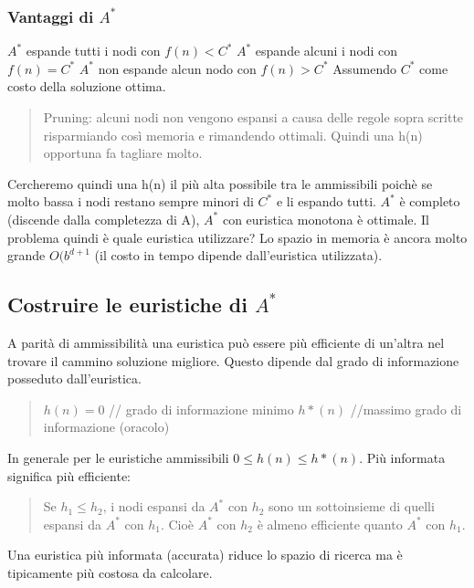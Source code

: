 \documentclass{article}
\begin{document}
\subsubsection{Vantaggi di $A^*$}
$A^*$ espande tutti i nodi con $f(n) < C^*$ \newline
$A^*$ espande alcuni i nodi con $f(n) = C^*$ \newline
$A^*$ non espande alcun nodo con $f(n) > C^*$ \newline
Assumendo $C^*$ come costo della soluzione ottima.
\begin{quote}
    Pruning: alcuni nodi non vengono espansi a causa delle regole sopra scritte risparmiando così memoria e rimandendo ottimali. Quindi una h(n) opportuna fa tagliare molto.
\end{quote}
Cercheremo quindi una h(n) il più alta possibile tra le ammissibili poichè se molto bassa i nodi restano sempre minori di $C^*$ e li espando tutti. \newline
$A^*$ è completo (discende dalla completezza di A), $A^*$ con euristica monotona è ottimale. Il problema quindi è quale euristica utilizzare? Lo spazio in memoria è ancora molto grande $O(b^{d+1}$ (il costo in tempo dipende dall'euristica utilizzata). 

\subsection{Costruire le euristiche di $A^*$}
A parità di ammissibilità una euristica può essere più efficiente di un'altra nel trovare il cammino soluzione migliore. Questo dipende dal grado di informazione posseduto dall'euristica.
\begin{quote}
    $h(n) = 0$ // grado di informazione minimo \newline
    $h*(n)$ //massimo grado di informazione (oracolo)
\end{quote}
In generale per le euristiche ammissibili $0 \leq h(n) \leq h*(n)$. \newline
Più informata significa più efficiente:
\begin{quote}
    Se $h_1 \leq h_2$, i nodi espansi da $A^*$ con $h_2$ sono un sottoinsieme di quelli espansi da $A^*$ con $h_1$. Cioè $A^*$ con $h_2$ è almeno efficiente quanto $A^*$ con $h_1$.
\end{quote}
Una euristica più informata (accurata) riduce lo spazio di ricerca ma è tipicamente più costosa da calcolare. 
\end{document}
